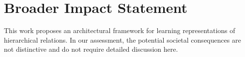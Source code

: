 \documentclass{article}
\begin{document}
\printAffiliationsAndNotice{}  %










% 





\section*{Broader Impact Statement}
This work proposes an architectural framework for learning representations of hierarchical relations. In our assessment, the potential societal consequences are not distinctive and do not require detailed discussion here.





% 

\clearpage
\newpage
\appendix
\onecolumn


\clearpage\newpage

\clearpage\newpage

\clearpage\newpage

\end{document}
